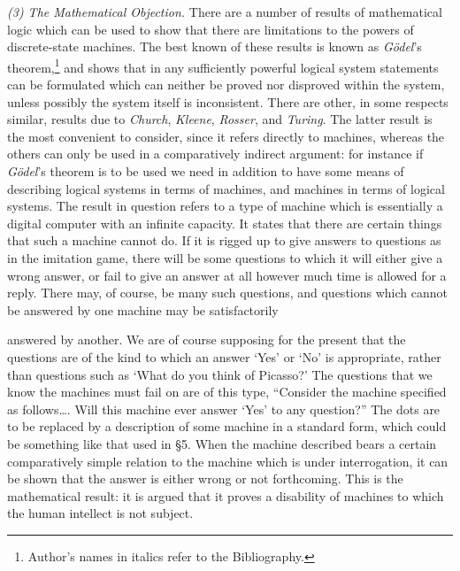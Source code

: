 \documentclass[10pt]{article} %
\begin{document}
\noindent\normalfont \textit{(3) The Mathematical Objection.} There are a number of results of mathematical logic which can be used to show that there are limitations to the powers of discrete-state machines. The best known of these results is known as \textit{Gödel}'s theorem,\footnote{\normalfont\tiny Author's names in italics refer to the Bibliography.} and shows that in any sufficiently powerful logical system statements can be formulated which can neither be proved nor disproved within the system, unless possibly the system itself is inconsistent. There are other, in some respects similar, results due to \textit{Church}, \textit{Kleene}, \textit{Rosser}, and \textit{Turing}. The latter result is the most convenient to consider, since it refers directly to machines, whereas the others can only be used in a comparatively indirect argument: for instance if \textit{Gödel}'s theorem is to be used we need in addition to have some means of describing logical systems in terms of machines, and machines in terms of logical systems. The result in question refers to a type of machine which is essentially a digital computer with an infinite capacity. It states that there are certain things that such a machine cannot do. If it is rigged up to give answers to questions as in the imitation game, there will be some questions to which it will either give a wrong answer, or fail to give an answer at all however much time is allowed for a reply. There may, of course, be many such questions, and questions which cannot be answered by one machine may be satisfactorily

answered by another. We are of course supposing for the present that the questions are of the kind to which an answer `Yes' or `No' is appropriate, rather than questions such as `What do you think of Picasso?' The questions that we know the machines must fail on are of this type, ``Consider the machine specified as follows\dots{}. Will this machine ever answer `Yes' to any question?'' The dots are to be replaced by a description of some machine in a standard form, which could be something like that used in \S 5. When the machine described bears a certain comparatively simple relation to the machine which is under interrogation, it can be shown that the answer is either wrong or not forthcoming. This is the mathematical result: it is argued that it proves a disability of machines to which the human intellect is not subject.
\end{document}
